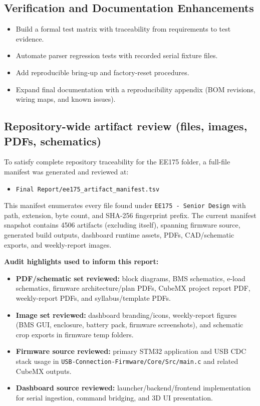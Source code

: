 \documentclass[12pt]{article}
\begin{document}
\subsection{Verification and Documentation Enhancements}
\begin{itemize}[leftmargin=1.2cm]
    \item Build a formal test matrix with traceability from requirements to test evidence.
    \item Automate parser regression tests with recorded serial fixture files.
    \item Add reproducible bring-up and factory-reset procedures.
    \item Expand final documentation with a reproducibility appendix (BOM revisions, wiring maps, and known issues).
\end{itemize}


\subsection{Repository-wide artifact review (files, images, PDFs, schematics)}
To satisfy complete repository traceability for the EE175 folder, a full-file manifest was generated and reviewed at:
\begin{itemize}[leftmargin=1.2cm]
    \item \texttt{Final Report/ee175\_artifact\_manifest.tsv}
\end{itemize}

This manifest enumerates every file found under \texttt{EE175 - Senior Design} with path, extension, byte count, and SHA-256 fingerprint prefix. The current manifest snapshot contains 4506 artifacts (excluding itself), spanning firmware source, generated build outputs, dashboard runtime assets, PDFs, CAD/schematic exports, and weekly-report images.

\textbf{Audit highlights used to inform this report:}
\begin{itemize}[leftmargin=1.2cm]
    \item \textbf{PDF/schematic set reviewed:} block diagrams, BMS schematics, e-load schematics, firmware architecture/plan PDFs, CubeMX project report PDF, weekly-report PDFs, and syllabus/template PDFs.
    \item \textbf{Image set reviewed:} dashboard branding/icons, weekly-report figures (BMS GUI, enclosure, battery pack, firmware screenshots), and schematic crop exports in firmware temp folders.
    \item \textbf{Firmware source reviewed:} primary STM32 application and USB CDC stack usage in \texttt{USB-Connection-Firmware/Core/Src/main.c} and related CubeMX outputs.
    \item \textbf{Dashboard source reviewed:} launcher/backend/frontend implementation for serial ingestion, command bridging, and 3D UI presentation.
\end{itemize}
\end{document}
